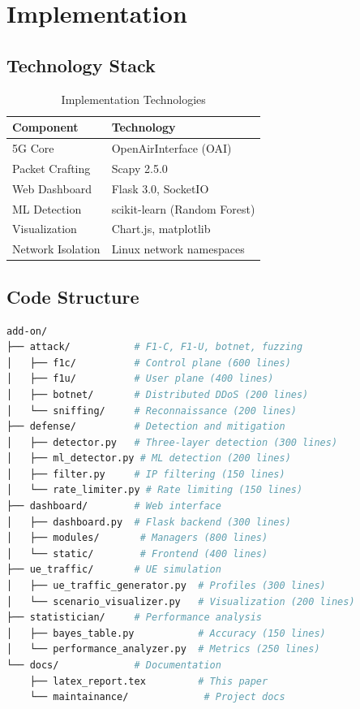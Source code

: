 \documentclass[conference]{IEEEtran}
\begin{document}
\section{Implementation}

\subsection{Technology Stack}

\begin{table}[h]
\centering
\caption{Implementation Technologies}
\begin{tabular}{ll}
\toprule
\textbf{Component} & \textbf{Technology} \\
\midrule
5G Core & OpenAirInterface (OAI) \\
Packet Crafting & Scapy 2.5.0 \\
Web Dashboard & Flask 3.0, SocketIO \\
ML Detection & scikit-learn (Random Forest) \\
Visualization & Chart.js, matplotlib \\
Network Isolation & Linux network namespaces \\
\bottomrule
\end{tabular}
\end{table}

\subsection{Code Structure}

\begin{lstlisting}[language=bash, basicstyle=\small\ttfamily]
add-on/
├── attack/           # F1-C, F1-U, botnet, fuzzing
│   ├── f1c/          # Control plane (600 lines)
│   ├── f1u/          # User plane (400 lines)
│   ├── botnet/       # Distributed DDoS (200 lines)
│   └── sniffing/     # Reconnaissance (200 lines)
├── defense/          # Detection and mitigation
│   ├── detector.py   # Three-layer detection (300 lines)
│   ├── ml_detector.py # ML detection (200 lines)
│   ├── filter.py     # IP filtering (150 lines)
│   └── rate_limiter.py # Rate limiting (150 lines)
├── dashboard/        # Web interface
│   ├── dashboard.py  # Flask backend (300 lines)
│   ├── modules/       # Managers (800 lines)
│   └── static/        # Frontend (400 lines)
├── ue_traffic/       # UE simulation
│   ├── ue_traffic_generator.py  # Profiles (300 lines)
│   └── scenario_visualizer.py   # Visualization (200 lines)
├── statistician/     # Performance analysis
│   ├── bayes_table.py           # Accuracy (150 lines)
│   └── performance_analyzer.py  # Metrics (250 lines)
└── docs/             # Documentation
    ├── latex_report.tex         # This paper
    └── maintainance/             # Project docs
\end{lstlisting}
\end{document}
